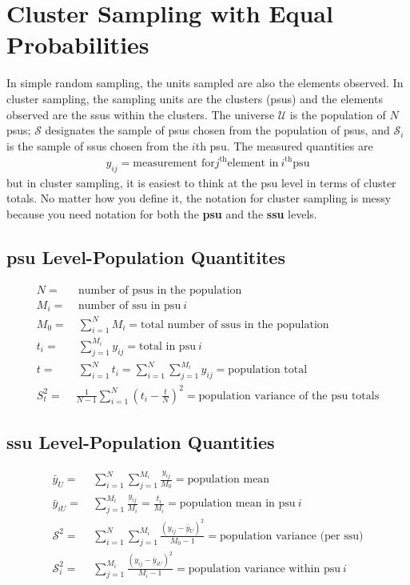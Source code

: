 \documentclass[a4paper,twoside,11pt]{article}
\begin{document}
\section{Cluster Sampling with Equal Probabilities}
In simple random sampling, the units sampled are also the elements observed. In cluster sampling, the sampling units are the clusters (psus) and the elements observed are the ssus within the clusters. The universe $\mathcal{U}$ is the population of $N$ psus; $\mathcal{S}$ designates the sample of psus chosen from the population of psus, and $\mathcal{S}_i$ is the sample of ssus chosen from the $i$th psu. The measured quantities are
\begin{equation*}
\begin{aligned}
y_{ij} = \text{measurement for} j^{\text{th}} \text{element in} \  i^{\text{th}} \text{psu}
\end{aligned}
\end{equation*}
but in cluster sampling, it is easiest to think at the psu level in terms of cluster totals. No matter how you define it, the notation for cluster sampling is messy because you need notation for both the \textbf{psu} and the \textbf{ssu} levels.
\subsection{psu Level-Population Quantitites}
\begin{equation*}
\begin{aligned}
N =& \ \text{number of psus in the population} \\
M_i =& \ \text{number of ssu in psu} \ i \\
M_0 =& \ \sum^N_{i=1} M_i = \text{total number of ssus in the population} \\
t_i =& \ \sum^{M_i}_{j=1} y_{ij} = \text{total in psu} \ i \\
t=& \ \sum^N_{i=1} t_i = \sum^N_{i=1} \sum^{M_i}_{j=1} y_{ij} = \text{population total} \\
S_t^2 =& \frac{1}{N-1}\sum^N_{i=1} (t_i - \frac{t}{N})^2 = \text{population variance of the psu totals}
\end{aligned}
\end{equation*}
\subsection{ssu Level-Population Quantities}
\begin{equation*}
\begin{aligned}
\bar{y}_U =& \ \sum^N_{i=1} \sum^{M_i}_{j=1} \frac{y_{ij}}{M_0} = \text{population mean} \\
\bar{y}_{iU} =& \ \sum^{M_i}_{j=1} \frac{y_{ij}}{M_i} = \frac{t_i}{M_i} = \text{population mean in psu} \ i \\
\mathcal{S}^2 =& \ \sum^N_{i=1} \sum^{M_i}_{j=1} \frac{(y_{ij} - \bar{y}_U)^2}{M_0 -1} = \text{population variance (per ssu)} \\
\mathcal{S}_i^2 =& \ \sum^{M_i}_{j=1} \frac{(y_{ij} - \bar{y}_{iU})^2}{M_i -1} = \text{population variance within psu} \ i
\end{aligned}
\end{equation*}
\end{document}
